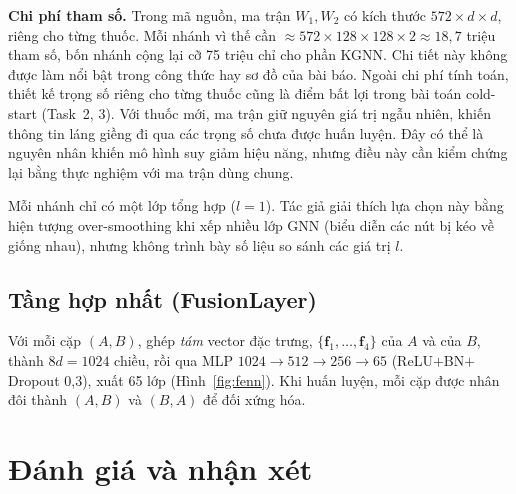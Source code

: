 \documentclass[conference]{IEEEtran}
\renewcommand{\hl}[1]{#1}
\renewcommand{\colorbox}[2]{#2}
\begin{document}
\textbf{\hl{Chi phí tham số.}} \hl{Trong mã nguồn, ma trận}
\colorbox{yellow}{$W_1, W_2$}
\hl{có kích thước}
\colorbox{yellow}{$572\times d\times d$}\hl{, riêng cho từng thuốc. Mỗi nhánh vì thế cần}
\colorbox{yellow}{$\approx 572\times128\times128\times2 \approx 18{,}7$}
\hl{triệu tham số, bốn nhánh cộng lại cỡ 75 triệu chỉ cho phần KGNN. Chi tiết này không được làm nổi bật trong
công thức hay sơ đồ của bài báo. Ngoài chi phí tính toán, thiết kế trọng số riêng cho từng thuốc cũng là điểm
bất lợi trong bài toán cold-start (Task~2, 3). Với thuốc mới, ma trận giữ nguyên giá trị ngẫu nhiên, khiến
thông tin láng giềng đi qua các trọng số chưa được huấn luyện. Đây có thể là nguyên nhân khiến mô hình suy giảm
hiệu năng, nhưng điều này cần kiểm chứng lại bằng thực nghiệm với ma trận dùng chung.}

Mỗi nhánh chỉ có một lớp tổng hợp ($l=1$). Tác giả giải thích lựa chọn này bằng hiện tượng
over-smoothing khi xếp nhiều lớp GNN (biểu diễn các nút bị kéo về giống nhau), nhưng không trình bày
số liệu so sánh các giá trị $l$.

\subsection{Tầng hợp nhất (FusionLayer)}
Với mỗi cặp $(A, B)$, ghép \emph{tám} vector đặc trưng, $\{\mathbf{f}_1,\dots,
\mathbf{f}_4\}$ của $A$ và của $B$, thành $8d = 1024$ chiều, rồi qua MLP
$1024 \to 512 \to 256 \to 65$ (ReLU$+$BN$+$Dropout 0,3), xuất 65 lớp
(Hình~\ref{fig:fenn}). Khi huấn luyện, mỗi cặp được nhân đôi thành $(A,B)$ và
$(B,A)$ để đối xứng hóa.


\section{Đánh giá và nhận xét}
\end{document}
